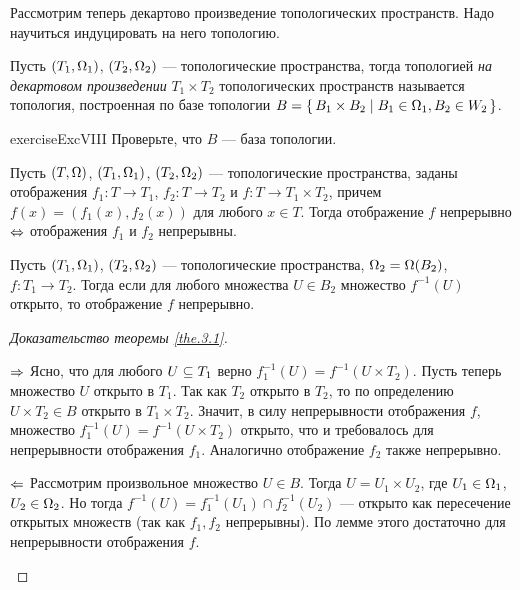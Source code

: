 \documentclass[main]{subfiles}
\begin{document}
Рассмотрим теперь декартово произведение топологических пространств. Надо научиться индуцировать на него топологию.

\begin{definition}
	Пусть $ (T_1, \Omega_1) $, $ (T_2, \Omega_2) $ --- топологические пространства, тогда топологией \emph{на декартовом
	произведении} $ T_1 \times T_2 $ топологических пространств называется топология, построенная по базе топологии
	$ B = \left\{\, B_1 \times B_2 \mid B_1 \in \Omega_1, B_2 \in W_2 \,\right\} $.
\end{definition}

\begin{restatable}{exercise}{ExcVIII}
	Проверьте, что $ B $ --- база топологии.
\end{restatable}

\begin{theorem} \label{the.3.1}
	Пусть $ (T, \Omega) $, $ (T_1, \Omega_1) $, $ (T_2,\Omega_2) $ --- топологические пространства, заданы отображения
	$ f_1 \colon T \to T_1 $, $ f_2 \colon T \to T_2 $ и $ f \colon T \to T_1 \times T_2 $,
	причем $ f(x) = (f_1(x), f_2(x)) $ для любого $ x \in T $. Тогда отображение $ f $ непрерывно
	$\Leftrightarrow$ отображения $ f_1 $ и $ f_2 $ непрерывны.
\end{theorem}

\begin{lemma} \label{lem.3.1}
	Пусть $ (T_1, \Omega_1) $, $ (T_2, \Omega_2) $ --- топологические пространства, $ \Omega_2 = \Omega(B_2) $,
	$ f \colon T_1 \to T_2 $. Тогда если для любого множества $ U \in B_2 $ множество $ f^{-1}(U) $ открыто,
	то отображение $ f $ непрерывно.
\end{lemma}

\begin{proof}[Доказательство теоремы \ref{the.3.1}] \leavevmode
	\begin{multiproof}
		\item[$\Rightarrow$] Ясно, что для любого $ U \subseteq T_1 $ верно $ f^{-1}_1(U) = f^{-1}( U \times T_2 ) $. Пусть
			теперь множество $ U $ открыто в $ T_1 $. Так как $ T_2 $ открыто в $ T_2 $, то по определению
			$ U \times T_2 \in B $ открыто в $ T_1 \times T_2 $. Значит, в силу непрерывности отображения $ f $,
			множество $ f^{-1}_1(U) = f^{-1}( U \times T_2 ) $ открыто, что и требовалось для непрерывности
			отображения $ f_1 $. Аналогично отображение $ f_2 $ также непрерывно.
		\item[$\Leftarrow$] Рассмотрим произвольное множество $ U \in B $. Тогда $ U = U_1 \times U_2 $, где $ U_1 \in \Omega_1 $,
			$ U_2 \in \Omega_2 $. Но тогда $ f^{-1}(U) = f^{-1}_1(U_1) \cap f^{-1}_2(U_2) $ --- открыто как пересечение
			открытых множеств (так как $ f_1, f_2 $ непрерывны). По лемме этого достаточно для непрерывности
			отображения $ f $.
	\end{multiproof}
\end{proof}
\end{document}
